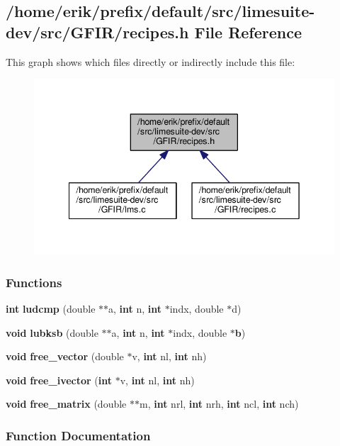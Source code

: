 \subsection{/home/erik/prefix/default/src/limesuite-\/dev/src/\+G\+F\+I\+R/recipes.h File Reference}
\label{recipes_8h}
This graph shows which files directly or indirectly include this file\+:
\nopagebreak
\begin{figure}[H]
\begin{center}
\leavevmode
\includegraphics[width=342pt]{d0/d09/recipes_8h__dep__incl}
\end{center}
\end{figure}
\subsubsection*{Functions}
\begin{DoxyCompactItemize}
\item 
{\bf int} {\bf ludcmp} (double $\ast$$\ast$a, {\bf int} n, {\bf int} $\ast$indx, double $\ast$d)
\item 
{\bf void} {\bf lubksb} (double $\ast$$\ast$a, {\bf int} n, {\bf int} $\ast$indx, double $\ast${\bf b})
\item 
{\bf void} {\bf free\+\_\+vector} (double $\ast$v, {\bf int} nl, {\bf int} nh)
\item 
{\bf void} {\bf free\+\_\+ivector} ({\bf int} $\ast$v, {\bf int} nl, {\bf int} nh)
\item 
{\bf void} {\bf free\+\_\+matrix} (double $\ast$$\ast$m, {\bf int} nrl, {\bf int} nrh, {\bf int} ncl, {\bf int} nch)
\end{DoxyCompactItemize}


\subsubsection{Function Documentation}
